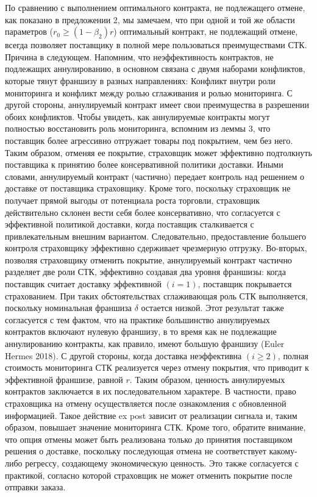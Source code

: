 \documentclass[a4paper,12pt]{article}
\begin{document}
По сравнению с выполнением оптимального контракта, не подлежащего отмене, как показано в предложении 2, мы замечаем, что при одной и той же области параметров ($r_{0} \geq (1-\beta_{2})r$) оптимальный контракт, не подлежащий отмене, всегда позволяет поставщику в полной мере пользоваться преимуществами СТК. Причина в следующем. Напомним, что неэффективность контрактов, не подлежащих аннулированию, в основном связана с двумя наборами конфликтов, которые тянут франшизу в разных направлениях: Конфликт внутри роли мониторинга и конфликт между ролью сглаживания и ролью мониторинга. С другой стороны, аннулируемый контракт имеет свои преимущества в разрешении обоих конфликтов. Чтобы увидеть, как аннулируемые контракты могут полностью восстановить роль мониторинга, вспомним из леммы 3, что поставщик более агрессивно отгружает товары под покрытием, чем без него. Таким образом, отменяя ее покрытие, страховщик может эффективно подтолкнуть поставщика к принятию более консервативной политики доставки. Иными словами, аннулируемый контракт (частично) передает контроль над решением о доставке от поставщика страховщику. Кроме того, поскольку страховщик не получает прямой выгоды от потенциала роста торговли, страховщик действительно склонен вести себя более консервативно, что согласуется с эффективной политикой доставки, когда поставщик сталкивается с привлекательным внешним вариантом. Следовательно, предоставление большего контроля страховщику эффективно сдерживает чрезмерную отгрузку.
Во-вторых, позволяя страховщику отменить покрытие, аннулируемый контракт частично разделяет две роли СТК, эффективно создавая два уровня франшизы: когда поставщик считает доставку эффективной $(i = 1)$, поставщик покрывается страхованием. При таких обстоятельствах сглаживающая роль СТК выполняется, поскольку номинальная франшиза $\delta$ остается низкой. Этот результат также согласуется с тем фактом, что на практике большинство аннулируемых контрактов включают нулевую франшизу, в то время как не подлежащие аннулированию контракты, как правило, имеют большую франшизу (Euler Hermes 2018). С другой стороны, когда доставка неэффективна $(i \geq 2)$, полная стоимость мониторинга СТК реализуется через отмену покрытия, что приводит к эффективной франшизе, равной $r$.
Таким образом, ценность аннулируемых контрактов заключается в их последовательном характере. В частности, право страховщика на отмену осуществляется после ознакомления с обновленной информацией. Такое действие ex post зависит от реализации сигнала и, таким образом, повышает значение мониторинга СТК. Кроме того, обратите внимание, что опция отмены может быть реализована только до принятия поставщиком решения о доставке, поскольку последующая отмена не соответствует какому-либо регрессу, создающему экономическую ценность. Это также согласуется с практикой, согласно которой страховщик не может отменить покрытие после отправки заказа.
\end{document}
